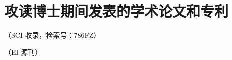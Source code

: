 

\chapter{攻读博士期间发表的学术论文和专利}


\begin{enumerate}[label={[\arabic*]}]
    \item {}（SCI 收录，检索号：786FZ）
    \item {}（EI 源刊）
    \item {}
\end{enumerate}
\endrefsection